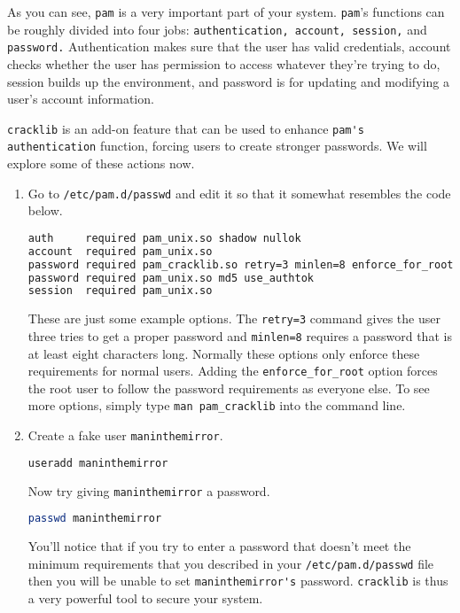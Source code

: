 \documentclass[11pt,a4paper]{article}
\begin{document}
As you can see, \verb|pam| is a very important part of your system. \verb|pam|'s functions can be roughly divided into four jobs: \verb|authentication, account, session,| and \verb|password.| Authentication makes sure that the user has valid credentials, account checks whether the user has permission to access whatever they're trying to do, session builds up the environment, and password is for updating and modifying a user's account information.  

\verb|cracklib| is an add-on feature that can be used to enhance \verb|pam's authentication| function, forcing users to create stronger passwords. We will explore some of these actions now.


\begin{enumerate}


\item Go to \verb|/etc/pam.d/passwd| and edit it so that it somewhat resembles the code below.

\begin{small}
\begin{lstlisting}[basicstyle=\ttfamily, backgroundcolor = \color{lightgray}, language = bash, xleftmargin = 0cm, framexleftmargin = 1em]
auth     required pam_unix.so shadow nullok
account  required pam_unix.so
password required pam_cracklib.so retry=3 minlen=8 enforce_for_root
password required pam_unix.so md5 use_authtok
session  required pam_unix.so
\end{lstlisting}
\end{small}

These are just some example options. The \verb|retry=3| command gives the user three tries to get a proper password and \verb|minlen=8| requires a password that is at least eight characters long. Normally these options only enforce these requirements for normal users. Adding the \verb|enforce_for_root| option forces the root user to follow the password requirements as everyone else. To see more options, simply type \verb|man pam_cracklib| into the command line.

\item Create a fake user \verb|maninthemirror|.

\begin{lstlisting}[basicstyle=\ttfamily, backgroundcolor = \color{lightgray}, language = bash, xleftmargin = 0cm, framexleftmargin = 1em]
useradd maninthemirror
\end{lstlisting}
Now try giving \verb|maninthemirror| a password.

\begin{lstlisting}[basicstyle=\ttfamily, backgroundcolor = \color{lightgray}, language = bash, xleftmargin = 0cm, framexleftmargin = 1em]
passwd maninthemirror
\end{lstlisting}

You'll notice that if you try to enter a password that doesn't meet the minimum requirements that you described in your \verb|/etc/pam.d/passwd| file then you will be unable to set \verb|maninthemirror's| password. \verb|cracklib| is thus a very powerful tool to secure your system. 

\end{enumerate}
\end{document}
